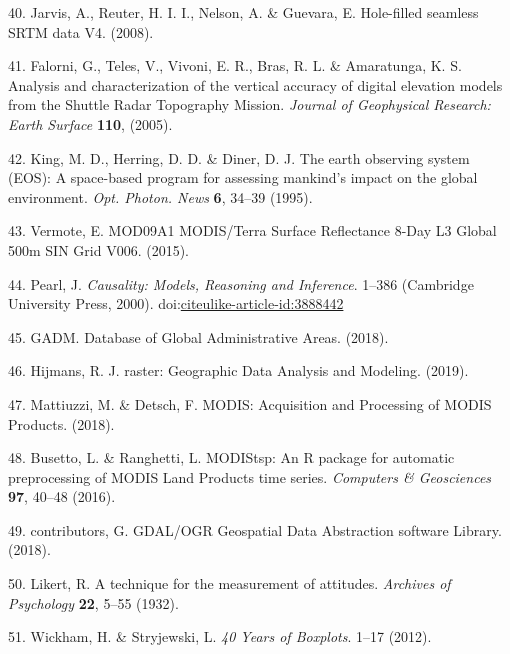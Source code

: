 \documentclass[12pt,oneside]{article}
\begin{document}
\leavevmode\hypertarget{ref-Jarvis_et_al_2008}{}%
40. Jarvis, A., Reuter, H. I. I., Nelson, A. \& Guevara, E. Hole-filled seamless SRTM data V4. (2008).

\leavevmode\hypertarget{ref-Falorni_et_al_2005}{}%
41. Falorni, G., Teles, V., Vivoni, E. R., Bras, R. L. \& Amaratunga, K. S. Analysis and characterization of the vertical accuracy of digital elevation models from the Shuttle Radar Topography Mission. \emph{Journal of Geophysical Research: Earth Surface} \textbf{110}, (2005).

\leavevmode\hypertarget{ref-King_et_al_1995}{}%
42. King, M. D., Herring, D. D. \& Diner, D. J. The earth observing system (EOS): A space-based program for assessing mankind's impact on the global environment. \emph{Opt. Photon. News} \textbf{6}, 34--39 (1995).

\leavevmode\hypertarget{ref-Vermote_2015}{}%
43. Vermote, E. MOD09A1 MODIS/Terra Surface Reflectance 8-Day L3 Global 500m SIN Grid V006. (2015).

\leavevmode\hypertarget{ref-Pearl_2000}{}%
44. Pearl, J. \emph{Causality: Models, Reasoning and Inference}. 1--386 (Cambridge University Press, 2000). doi:\href{https://doi.org/citeulike-article-id:3888442}{citeulike-article-id:3888442}

\leavevmode\hypertarget{ref-GADM_2018}{}%
45. GADM. Database of Global Administrative Areas. (2018).

\leavevmode\hypertarget{ref-Hijmans_2019}{}%
46. Hijmans, R. J. raster: Geographic Data Analysis and Modeling. (2019).

\leavevmode\hypertarget{ref-Mattiuzzi_and_Detsch_2018}{}%
47. Mattiuzzi, M. \& Detsch, F. MODIS: Acquisition and Processing of MODIS Products. (2018).

\leavevmode\hypertarget{ref-Busetto_and_ranghetti_2016}{}%
48. Busetto, L. \& Ranghetti, L. MODIStsp: An R package for automatic preprocessing of MODIS Land Products time series. \emph{Computers \& Geosciences} \textbf{97}, 40--48 (2016).

\leavevmode\hypertarget{ref-GDAL_OGRcontributors_2018}{}%
49. contributors, G. GDAL/OGR Geospatial Data Abstraction software Library. (2018).

\leavevmode\hypertarget{ref-Likert_1932}{}%
50. Likert, R. A technique for the measurement of attitudes. \emph{Archives of Psychology} \textbf{22}, 5--55 (1932).

\leavevmode\hypertarget{ref-Wickham_and_Stryjewski_2012}{}%
51. Wickham, H. \& Stryjewski, L. \emph{40 Years of Boxplots}. 1--17 (2012).
\end{document}
